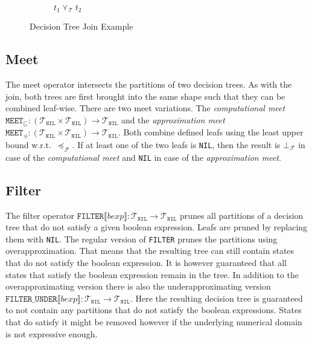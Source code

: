\documentclass[11pt,a4paper,titlepage]{article}
\theoremstyle{definition}
\begin{document}
\begin{figure}
\begin{subfigure}[b]{0.5\textwidth}
        \caption{$t_1 \curlyvee_{\mathcal{T}} t_2$}
    \end{subfigure}

    \caption{Decision Tree Join Example}
    \label{fig:decision_tree_join_example}
\end{figure}

\subsection{Meet}\label{sec:tree_meet}
The meet operator intersects the partitions of two decision trees. As with the join, both trees are first
brought into the same shape such that they can be combined leaf-wise. There are two meet variations. 
The \textit{computational meet} $\mathtt{MEET}_\sqsubseteq \colon (\mathcal{T}_\mathtt{NIL} \times \mathcal{T}_\mathtt{NIL}) \rightarrow \mathcal{T}_\mathtt{NIL}$
and the \textit{approximation meet} $\mathtt{MEET}_\preceq \colon (\mathcal{T}_\mathtt{NIL} \times \mathcal{T}_\mathtt{NIL}) \rightarrow \mathcal{T}_\mathtt{NIL}$. 
Both combine defined leafs using the least upper bound w.r.t.\ $\preceq_{\mathcal{F}}$. 
If at least one of the two leafs is \texttt{NIL}, then the result is $\bot_\mathcal{F}$ in case of the 
\textit{computational meet} and \texttt{NIL} in case of the \textit{approximation meet}.


\subsection{Filter}\label{sec:tree_filter}
The filter operator $\mathtt{FILTER}\llbracket bexp \rrbracket \colon \mathcal{T}_\mathtt{NIL} \rightarrow \mathcal{T}_\mathtt{NIL}$
prunes all partitions of a decision tree that do not satisfy a given boolean expression. Leafs are pruned by replacing them with \texttt{NIL}.
The regular version of \texttt{FILTER} prunes the partitions using overapproximation. 
That means that the resulting tree can still contain states that do not satisfy the boolean expression. It is however guaranteed that all states 
that satisfy the boolean expression remain in the tree. In addition to the overapproximating version there is also the underapproximating version
$\mathtt{FILTER\_UNDER}\llbracket bexp \rrbracket \colon \mathcal{T}_\mathtt{NIL} \rightarrow \mathcal{T}_\mathtt{NIL}$. Here the resulting decision
tree is guaranteed to not contain any partitions that do not satisfy the boolean expressions. States that do satisfy it might be removed however if
the underlying numerical domain is not expressive enough.
\end{document}
